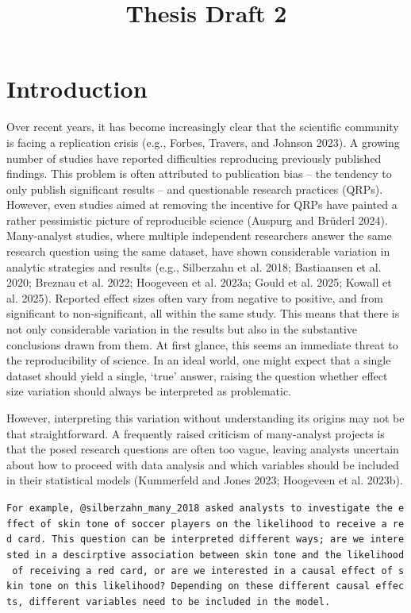 \documentclass[
  letterpaper,
  DIV=11,
  numbers=noendperiod]{scrartcl}
\title{Thesis Draft 2}
\author{}
\date{}
\begin{document}
\maketitle


\section{Introduction}\label{introduction}

Over recent years, it has become increasingly clear that the scientific
community is facing a replication crisis (e.g., Forbes, Travers, and
Johnson 2023). A growing number of studies have reported difficulties
reproducing previously published findings. This problem is often
attributed to publication bias -- the tendency to only publish
significant results -- and questionable research practices (QRPs).
However, even studies aimed at removing the incentive for QRPs have
painted a rather pessimistic picture of reproducible science (Auspurg
and Brüderl 2024). Many-analyst studies, where multiple independent
researchers answer the same research question using the same dataset,
have shown considerable variation in analytic strategies and results
(e.g., Silberzahn et al. 2018; Bastiaansen et al. 2020; Breznau et al.
2022; Hoogeveen et al. 2023a; Gould et al. 2025; Kowall et al. 2025).
Reported effect sizes often vary from negative to positive, and from
significant to non-significant, all within the same study. This means
that there is not only considerable variation in the results but also in
the substantive conclusions drawn from them. At first glance, this seems
an immediate threat to the reproducibility of science. In an ideal
world, one might expect that a single dataset should yield a single,
`true' answer, raising the question whether effect size variation should
always be interpreted as problematic.

However, interpreting this variation without understanding its origins
may not be that straightforward. A frequently raised criticism of
many-analyst projects is that the posed research questions are often too
vague, leaving analysts uncertain about how to proceed with data
analysis and which variables should be included in their statistical
models (Kummerfeld and Jones 2023; Hoogeveen et al. 2023b).

\texttt{For\ example,\ @silberzahn\_many\_2018\ asked\ analysts\ to\ investigate\ the\ effect\ of\ skin\ tone\ of\ soccer\ players\ on\ the\ likelihood\ to\ receive\ a\ red\ card.\ This\ question\ can\ be\ interpreted\ different\ ways;\ are\ we\ interested\ in\ a\ descirptive\ association\ between\ skin\ tone\ and\ the\ likelihood\ of\ receiving\ a\ red\ card,\ or\ are\ we\ interested\ in\ a\ causal\ effect\ of\ skin\ tone\ on\ this\ likelihood?\ Depending\ on\ these\ different\ causal\ effects,\ different\ variables\ need\ to\ be\ included\ in\ the\ model.}
\end{document}
